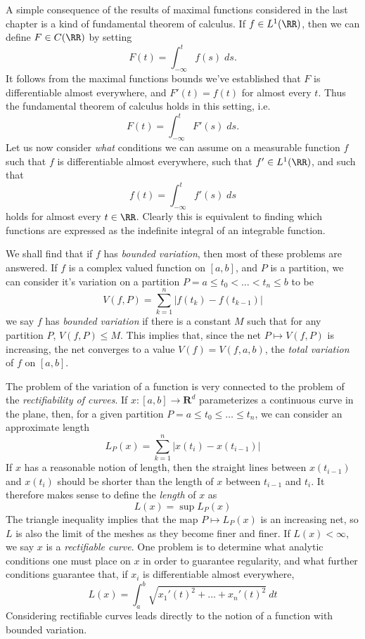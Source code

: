 A simple consequence of the results of maximal functions considered in the last chapter is a kind of fundamental theorem of calculus. If $f \in L^1(\RR)$, then we can define $F \in C(\RR)$ by setting
%
\[ F(t) = \int_{-\infty}^t f(s)\; ds. \]
%
It follows from the maximal functions bounds we've established that $F$ is differentiable almost everywhere, and $F'(t) = f(t)$ for almost every $t$. Thus the fundamental theorem of calculus holds in this setting, i.e.
%
\[ F(t) = \int_{-\infty}^t F'(s)\; ds. \]
%
Let us now consider \emph{what} conditions we can assume on a measurable function $f$ such that $f$ is differentiable almost everywhere, such that $f' \in L^1(\RR)$, and such that
%
\[ f(t) = \int_{-\infty}^t f'(s)\; ds \]
%
holds for almost every $t \in \RR$. Clearly this is equivalent to finding which functions are expressed as the indefinite integral of an integrable function.

We shall find that if $f$ has {\it bounded variation}, then most of these problems are answered. If $f$ is a complex valued function on $[a,b]$, and $P$ is a partition, we can consider it's variation on a partition $P = a \leq t_0 < \dots < t_n \leq b$ to be
%
\[ V(f,P) = \sum_{k = 1}^n |f(t_k) - f(t_{k-1})| \]
%
we say $f$ has \emph{bounded variation} if there is a constant $M$ such that for any partition $P$, $V(f,P) \leq M$. This implies that, since the net $P \mapsto V(f,P)$ is increasing, the net converges to a value $V(f) = V(f,a,b)$, the \emph{total variation} of $f$ on $[a,b]$.

The problem of the variation of a function is very connected to the problem of the {\it rectifiability of curves}. If $x: [a,b] \to \mathbf{R}^d$ parameterizes a continuous curve in the plane, then, for a given partition $P = a \leq t_0 \leq \dots \leq t_n$, we can consider an approximate length
%
\[ L_P(x) = \sum_{k = 1}^n |x(t_i) - x(t_{i-1})| \]
%
If $x$ has a reasonable notion of length, then the straight lines between $x(t_{i-1})$ and $x(t_i)$ should be shorter than the length of $x$ between $t_{i-1}$ and $t_i$. It therefore makes sense to define the \emph{length} of $x$ as
%
\[ L(x) = \sup L_P(x) \]
%
The triangle inequality implies that the map $P \mapsto L_P(x)$ is an increasing net, so $L$ is also the limit of the meshes as they become finer and finer. If $L(x) < \infty$, we say $x$ is a \emph{rectifiable curve}. One problem is to determine what analytic conditions one must place on $x$ in order to guarantee regularity, and what further conditions guarantee that, if $x_i$ is differentiable almost everywhere,
%
\[ L(x) = \int_a^b \sqrt{x_1'(t)^2 + \dots + x_n'(t)^2}\ dt \]
%
Considering rectifiable curves leads directly to the notion of a function with bounded variation.


